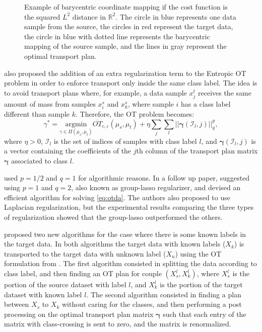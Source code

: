 \begin{figure}[H]
  \centering
  \def\svgscale{0.8}
  
	\caption{Example of barycentric coordinate mapping if the cost function is the squared $L^2$ distance in
  $\mathbb R^2$. The circle in blue represents one data sample from the source, the circles in red
  represent the target data, the circle in blue with dotted line represents the barycentric mapping
  of the source sample, and the lines in gray represent the optimal transport plan.}
	\label{fig:barycentriccoordinate}
\end{figure}

\citet{courty2014domain} also proposed the addition of an extra regularization term to the
Entropic OT problem in order to enforce transport only inside the same class label.
The idea is to avoid transport plans where, for example, a data sample $x_j^t$
receives the same amount of mass from samples $x_i^s$ and $x_k^s$, where sample $i$ has
a class label different than sample $k$. Therefore, the OT problem becomes:
\begin{equation}
  \gamma^* = \underset{\gamma \in \Pi(\mu_s,\mu_t)}{\mathrm{argmin}} \overline{OT}_{c,\varepsilon}(\mu_s,\mu_t)
  + \eta \sum_j \sum_l || \bm \gamma(\mathcal I_l, j)||^p_q,
  \label{eq:otda}
\end{equation}
where $\eta >0$, $\mathcal I_l$ is the set of indices of samples with class label $l$, and
$\bm \gamma(\mathcal I_l, j)$ is a vector containing the coefficients of the $j$th column
of the transport plan matrix $\bm \gamma$ associated to class $l$.

\citet{courty2014domain} used $p=1/2$ and $q=1$ for algorithmic reasons.
In a follow up paper, \citet{courty2016optimal} suggested using
$p=1$ and $q=2$, also known as group-lasso regularizer,
and devised an efficient algorithm for solving \eqref{eq:otda}.
The authors also proposed to use Laplacian regularization, but the experimental
results comparing the three types of regularization
showed that the group-lasso outperformed the others.

\citet{rousselle2015optimal} proposed two new algorithms
for the case where there is some known labels in the target data. In both algorithms the target data with known labels ($X_{k}$)
is transported to the target data with unknown label ($X_{u}$) using the OT formulation from
\citet{courty2014domain}. The first algorithm consisted in
splitting the data according to class label, and then finding an OT plan for couple $(X_{s}^l, X_k^l)$,
where $X_s^l$ is the portion of the source dataset with label $l$, and $X_k^l$ is the portion of the target
dataset with known label $l$.
The second algorithm consisted in finding a plan between $X_{s}$ to $X_{k}$
without caring for the classes, and then performing a post processing on the optimal transport plan matrix
$\mathbf \gamma$ such that each entry of the matrix with class-crossing is sent to zero, and the matrix is renormalized.

